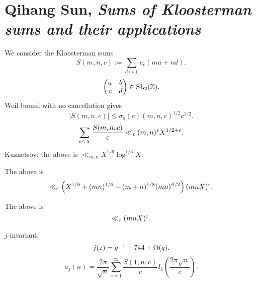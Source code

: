 \documentclass[reqno]{amsart} 
\begin{document}
\section{Qihang Sun, \emph{Sums of Kloosterman sums and their applications}}
We consider the Kloosterman sums
\begin{equation*}
  S (m, n, c ) := \sum_{d (c)} e_c (m a + n d).
\end{equation*}
\begin{equation*}
  \begin{pmatrix}
    a & b \\
    c & d \\
  \end{pmatrix} \in \operatorname{SL}_2(\mathbb{Z}).
\end{equation*}
Weil bound with no cancellation gives
\begin{equation*}
  \left\lvert S (m, n, c) \right\rvert \leq \sigma_0 (c)
  (m, n, c)^{1/2} c^{1/2}.
\end{equation*}
\begin{equation*}
  \sum_{c \leq X}
  \frac{S (m, n, c)}{c}
  \ll_\varepsilon (m, n )^\varepsilon X^{1/2 + \varepsilon }.
\end{equation*}
Kuznetsov: the above is $\ll_{m, n} X^{1/6} \log^{1/3} X$.

\begin{theorem}
  The above is
  \begin{equation*}
    \ll_\varepsilon \left( X^{1/6} + (m n )^{1/6}
      + (m + n )^{1/8}
      (m n )^{\vartheta  / 2}
    \right)
    (m n X)^\varepsilon.  
  \end{equation*}
\end{theorem}

\begin{conjecture}
  The above is
  \begin{equation*}
    \ll_\varepsilon (m n X)^\varepsilon .
  \end{equation*}
\end{conjecture}

$j$-invariant:
\begin{equation*}
  j (z ) = q^{-1} + 744 + \operatorname{O}(q).
\end{equation*}
\begin{equation*}
  a_j (n ) = \frac{2 \pi }{ \sqrt{n}} \sum_{c = 1 }^\infty \frac{S (1, n, c)}{c} I_1 \left( \frac{2 \pi \sqrt{n}}{c} \right).
\end{equation*}
\end{document}
